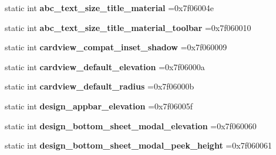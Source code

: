 \begin{DoxyCompactItemize}
static int {\bfseries abc\+\_\+text\+\_\+size\+\_\+title\+\_\+material} =0x7f06004e
\item 
\mbox{\label{classandroid_1_1support_1_1v7_1_1mediarouter_1_1R_1_1dimen_a23b9d0081ac70f39f8d898b4b0efa9e3}} 
static int {\bfseries abc\+\_\+text\+\_\+size\+\_\+title\+\_\+material\+\_\+toolbar} =0x7f060010
\item 
\mbox{\label{classandroid_1_1support_1_1v7_1_1mediarouter_1_1R_1_1dimen_a4ac05ff4093473f88e12f6fc0da15a98}} 
static int {\bfseries cardview\+\_\+compat\+\_\+inset\+\_\+shadow} =0x7f060009
\item 
\mbox{\label{classandroid_1_1support_1_1v7_1_1mediarouter_1_1R_1_1dimen_a19be6b6757c9670fbee469097d8eb85f}} 
static int {\bfseries cardview\+\_\+default\+\_\+elevation} =0x7f06000a
\item 
\mbox{\label{classandroid_1_1support_1_1v7_1_1mediarouter_1_1R_1_1dimen_a07f2cbeb963105433f1efc1e7afc68ec}} 
static int {\bfseries cardview\+\_\+default\+\_\+radius} =0x7f06000b
\item 
\mbox{\label{classandroid_1_1support_1_1v7_1_1mediarouter_1_1R_1_1dimen_a6d05810ed9ac331ca9d37947034282dc}} 
static int {\bfseries design\+\_\+appbar\+\_\+elevation} =0x7f06005f
\item 
\mbox{\label{classandroid_1_1support_1_1v7_1_1mediarouter_1_1R_1_1dimen_a7a725784ad9be816308bfad1050d381b}} 
static int {\bfseries design\+\_\+bottom\+\_\+sheet\+\_\+modal\+\_\+elevation} =0x7f060060
\item 
\mbox{\label{classandroid_1_1support_1_1v7_1_1mediarouter_1_1R_1_1dimen_a91a9ea8c6af8be5fc9e259f025700b0d}} 
static int {\bfseries design\+\_\+bottom\+\_\+sheet\+\_\+modal\+\_\+peek\+\_\+height} =0x7f060061
\item 
\mbox{\label{classandroid_1_1support_1_1v7_1_1mediarouter_1_1R_1_1dimen_a628dd3061eed5f38c154753b23e645bd}} 

\end{DoxyCompactItemize}
